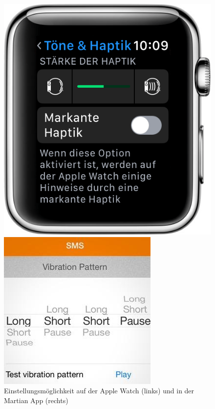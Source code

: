 \begin{figure}[htbp] 
	\centering
	\begin{minipage}[t]{0.4\textwidth}
		\includegraphics[width=\textwidth]{pics/applewatch.png}
	\end{minipage}
	\begin{minipage}[t]{0.4\textwidth}
		\includegraphics[width=\textwidth]{pics/martian.jpg}
	\end{minipage}
	\caption{Einstellungsm{\"o}glichkeit auf der Apple Watch (links) und in der Martian App (rechts)}
	\label{fig:Bild10}
\end{figure}

